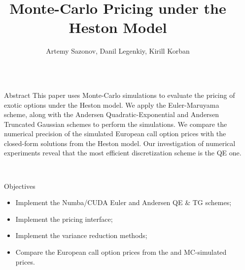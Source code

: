 \documentclass[]{beamer}
\title{Monte-Carlo Pricing under the Heston Model}
\author{Artemy Sazonov, Danil Legenkiy, Kirill Korban}
\begin{document}
\nocite{*} %

\begin{frame}[t]
    \begin{columns}[t] %
     
    \begin{column}{\sepwid}\end{column} %
    
    \begin{column}{\onecolwid} %
     
    
    \begin{block}{Abstract}
        This paper uses Monte-Carlo simulations to evaluate the pricing of exotic options 
        under the Heston model. We apply the Euler-Maruyama scheme, along with the Andersen 
        Quadratic-Exponential and Andersen Truncated Gaussian schemes to perform the simulations.
        We compare the numerical precision of the simulated European call option prices with the 
        closed-form solutions from the Heston model. Our investigation of numerical experiments 
        reveal that the most efficient discretization scheme is the QE one.

        \
    \end{block}
    
    \vspace{1.in}

    \begin{alertblock}{Objectives}
    \begin{itemize}
    \item Implement the Numba/CUDA Euler and Andersen QE \& TG schemes;
    \item Implement the pricing interface;
    \item Implement the variance reduction methods;
    \item Compare the European call option prices from the \cite{Heston1993} and MC-simulated prices.
    \end{itemize}
    \end{alertblock}


\end{column}
\end{columns}
\end{frame}
\end{document}
